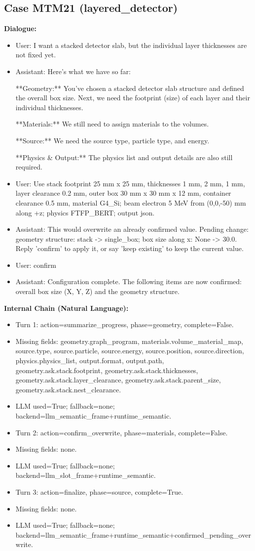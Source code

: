 \documentclass[11pt]{ctexart}
\begin{document}
\subsection{Case MTM21 (layered\_detector)}
\textbf{Dialogue:}
\begin{itemize}
\item User: I want a stacked detector slab, but the individual layer thicknesses are not fixed yet.
\item Assistant: Here's what we have so far:

**Geometry:** You've chosen a stacked detector slab structure and defined the overall box size. Next, we need the footprint (size) of each layer and their individual thicknesses.

**Materials:** We still need to assign materials to the volumes.

**Source:** We need the source type, particle type, and energy.

**Physics \& Output:** The physics list and output details are also still required.
\item User: Use stack footprint 25 mm x 25 mm, thicknesses 1 mm, 2 mm, 1 mm, layer clearance 0.2 mm, outer box 30 mm x 30 mm x 12 mm, container clearance 0.5 mm, material G4\_Si; beam electron 5 MeV from (0,0,-50) mm along +z; physics FTFP\_BERT; output json.
\item Assistant: This would overwrite an already confirmed value. Pending change: geometry structure: stack -> single\_box; box size along x: None -> 30.0. Reply 'confirm' to apply it, or say 'keep existing' to keep the current value.
\item User: confirm
\item Assistant: Configuration complete. The following items are now confirmed: overall box size (X, Y, Z) and the geometry structure.
\end{itemize}
\textbf{Internal Chain (Natural Language):}
\begin{itemize}
\item Turn 1: action=summarize\_progress, phase=geometry, complete=False.
\item Missing fields: geometry.graph\_program, materials.volume\_material\_map, source.type, source.particle, source.energy, source.position, source.direction, physics.physics\_list, output.format, output.path, geometry.ask.stack.footprint, geometry.ask.stack.thicknesses, geometry.ask.stack.layer\_clearance, geometry.ask.stack.parent\_size, geometry.ask.stack.nest\_clearance.
\item LLM used=True; fallback=none; backend=llm\_semantic\_frame+runtime\_semantic.
\item Turn 2: action=confirm\_overwrite, phase=materials, complete=False.
\item Missing fields: none.
\item LLM used=True; fallback=none; backend=llm\_slot\_frame+runtime\_semantic.
\item Turn 3: action=finalize, phase=source, complete=True.
\item Missing fields: none.
\item LLM used=True; fallback=none; backend=llm\_semantic\_frame+runtime\_semantic+confirmed\_pending\_overwrite.
\end{itemize}
\end{document}

